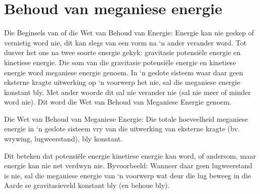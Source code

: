 \section{Behoud van meganiese energie }
            \nopagebreak
{} { Die Beginsels van of die Wet van Behoud van Energie: Energie kan nie geskep of vernietig word nie, dit kan slegs van een vorm na ‘n ander verander word.  } 
        \label{m38786*id68483}Tot dusver het ons na twee soorte energie gekyk: gravitasie potensiële energie en kinetiese energie. Die som van die gravitasie potensiële energie en kinetiese energie word meganiese energie genoem. In ‘n geslote sisteem waar daar geen eksterne kragte uitwerking op ‘n voorwerp het nie, sal die meganiese energie konstant bly. Met ander woorde dit sal nie verander nie (sal nie meer of minder word nie). Dit word die Wet van Behoud van Meganiese Energie genoem. 

 { Die Wet van Behoud van Meganiese Energie:  Die totale hoeveelheid meganiese energie in ‘n geslote sisteem vry van die uitwerking van eksterne kragte (bv. wrywing, lugweerstand), bly konstant.  } 

Dit beteken dat potensiële energie kinetiese energie kan word, of andersom, maar energie kan nie net verdwyn nie. Byvoorbeeld: Wanneer daar geen lugweerstand is nie, sal die meganiese energie van ‘n voorwerp wat deur die lug beweeg in die Aarde se gravitasieveld konstant bly (en behoue bly).




